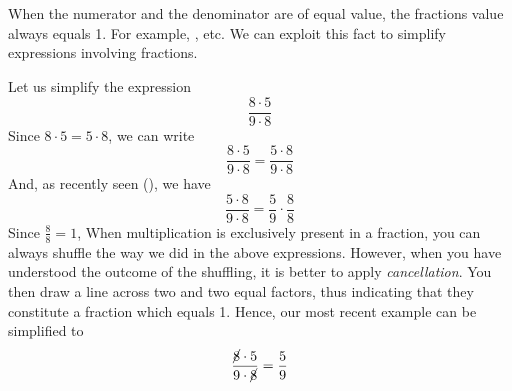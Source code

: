 \section{\brkans}
When the numerator and the denominator are of equal value, the fractions value always equals 1. For example, ,  etc. We can exploit this fact to simplify expressions involving fractions. \vsk

Let us simplify the expression
\[ \frac{8\cdot 5}{9\cdot8} \]
Since $ {8\cdot5}={5\cdot8} $, we can write
\[ \frac{8\cdot5}{9\cdot8}=\frac{5\cdot8}{9\cdot8} \]
And, as recently seen (), we have
\[\frac{5\cdot8}{9\cdot8}= \frac{5}{9}\cdot\frac{8}{8}\]
Since $ {\frac{8}{8}=1} $,
When multiplication is exclusively present in a fraction, you can always shuffle the way we did in the above expressions. However, when you have understood the outcome of the shuffling, it is better to apply \textit{cancellation}. You then draw a line across two and two equal factors, thus indicating that they constitute a fraction which equals 1. Hence, our most recent example can be simplified to
\[ \frac{\cancel{8}\cdot 5}{9\cdot\cancel{8}}=\frac{5}{9} \]
\newpage
{}
\newpage
{} \vsk
